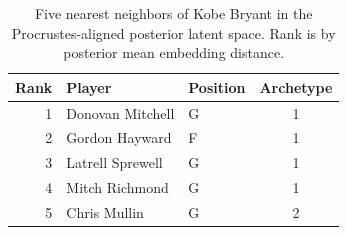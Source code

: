 \begin{table}[htbp]
  \centering\small
  \begin{tabular}{rllc}
    \toprule
    Rank & Player & Position & Archetype \\
    \midrule
    1 & Donovan Mitchell & G & 1 \\
    2 & Gordon Hayward & F & 1 \\
    3 & Latrell Sprewell & G & 1 \\
    4 & Mitch Richmond & G & 1 \\
    5 & Chris Mullin & G & 2 \\
    \bottomrule
  \end{tabular}
  \caption{Five nearest neighbors of Kobe Bryant in the Procrustes-aligned posterior latent space. Rank is by posterior mean embedding distance.}
  \label{tab:Kobe_Bryant_neighbors}
\end{table}

